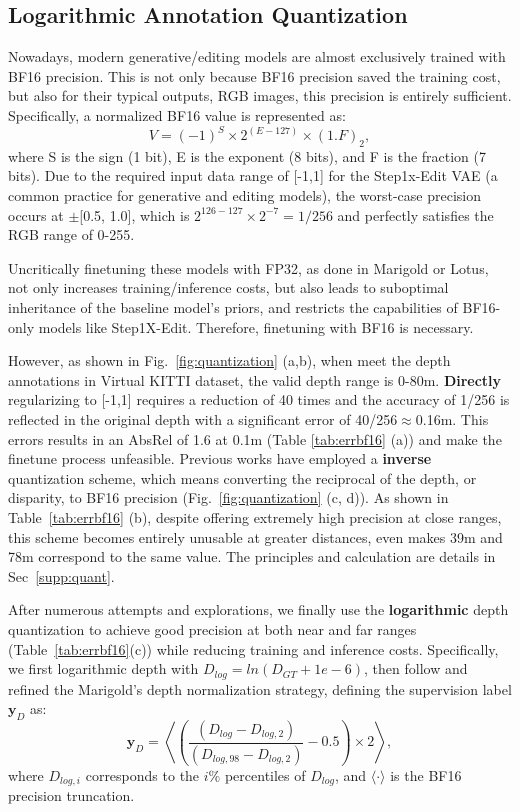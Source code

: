 \documentclass{article} %
\begin{document}
\subsection{Logarithmic Annotation Quantization}
\label{sec:quantization}

Nowadays, modern generative/editing models are almost exclusively trained with BF16 precision. This is not only because BF16 precision saved the training cost, but also for their typical outputs, RGB images, this precision is entirely sufficient. Specifically, a normalized BF16 value is represented as:
$$
V = (-1)^{S} \times 2^{(E - 127)} \times (1.F)_{2},
$$
where S is the sign (1 bit), E is the exponent (8 bits), and F is the fraction (7 bits). Due to the required input data range of [-1,1] for the Step1x-Edit VAE (a common practice for generative and editing models), the worst-case precision occurs at $\pm$[0.5, 1.0], which is $2^{126-127} \times 2^{-7}=1/{256}$ and perfectly satisfies the RGB range of 0-255.  

Uncritically finetuning these models with FP32, as done in Marigold or Lotus, not only increases training/inference costs, but also leads to suboptimal inheritance of the baseline model's priors, and restricts the capabilities of BF16-only models like Step1X-Edit. Therefore, finetuning with BF16 is necessary.

However, as shown in Fig.~\ref{fig:quantization} (a,b), when meet the depth annotations in Virtual KITTI dataset, the valid depth range is 0-80m. \textbf{Directly} regularizing to [-1,1] requires a reduction of 40 times and the accuracy of 1/256 is reflected in the original depth with a significant error of 40/256$\approx$0.16m. This errors results in an AbsRel of 1.6 at 0.1m (Table \ref{tab:errbf16} (a)) and make the finetune process unfeasible. Previous works have employed a \textbf{inverse} quantization scheme, which means converting the reciprocal of the depth, or disparity, to BF16 precision (Fig.~\ref{fig:quantization} (c, d)). As shown in Table~\ref{tab:errbf16} (b), despite offering extremely high precision at close ranges, this scheme becomes entirely unusable at greater distances, even makes 39m and 78m correspond to the same value. The principles and calculation are details in Sec~\ref{supp:quant}.

After numerous attempts and explorations, we finally use the \textbf{logarithmic} depth quantization to achieve good precision at both near and far ranges (Table~\ref{tab:errbf16}(c)) while reducing training and inference costs. Specifically, we first logarithmic depth with ${D}_{log}=ln({D}_{GT}+1e-6)$, then follow and refined the Marigold's depth normalization strategy, defining the supervision label $\mathbf{y}_D$ as:
\begin{equation}
    \label{eq:log_quantization}
		\mathbf{y}_D = \left\langle \left( \frac{({D}_{log}-{D}_{log,2})}{({D}_{log,98}-{D}_{log,2})} - 0.5 \right) \times 2 \right\rangle,
\end{equation}
where ${D}_{log,i}$ corresponds to the $i\%$ percentiles of ${D}_{log}$, and $\langle\cdot\rangle$ is the BF16 precision truncation.
\end{document}
